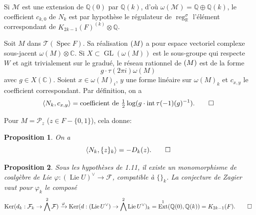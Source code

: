 \documentclass[12pt,a4paper]{article}
\theoremstyle{plain}
\newtheorem{proposition}{Proposition}[section]
\theoremstyle{definition}
\theoremstyle{remark}
\DeclareMathOperator{\Ext}{Ext}
\DeclareMathOperator*{\Ker}{Ker}
\DeclareMathOperator{\reg}{reg}
\DeclareMathOperator{\Spec}{Spec}
\DeclareMathOperator{\Lie}{Lie}
\DeclareMathOperator{\intt}{int}
\newcommand{\Q}{\mathbb{Q}}
\newcommand{\R}{\mathbb{R}}
\newcommand{\C}{\mathbb{C}}
\newcommand{\F}{\mathcal{F}}
\begin{document}
Si $\mathcal{M}$ est une extension de $\Q(0)$ par $\Q(k)$, d'o{\`u} $\omega(\mathcal{M})=\Q\oplus\Q(k)$, le coefficient $c_{k,0}$ de $N_k$ est par hypoth{\`e}se le r{\'e}gulateur de $\reg_\R^\sigma$ l'{\'e}l{\'e}ment correspondant de $K_{2k-1}(F)^{(k)}\otimes\Q$.

Soit $M$ dans $\mathcal{T}(\Spec F)$. Sa r{\'e}alisation $\real(M)$ a pour espace vectoriel complexe sous-jacent $\omega(M)\otimes\C$. Si $X\subset\operatorname{GL}(\omega(M))$ est le sous-groupe qui respecte $W$ et agit trivialement sur le gradu{\'e}, le r{\'e}seau rationnel de $\real(M)$ est de la forme
\begin{equation*}
g\cdot\tau(2\pi i)\omega(M)
\end{equation*}
avec $g\in X(\C)$. Soient $x\in\omega(M)_i$, $y$ une forme lin{\'e}aire sur $\omega(M)_k$ et $c_{x,y}$ le coefficient correspondant. Par d{\'e}finition, on a
\begin{equation*}
\langle N_k,c_{x,y}\rangle = \text{coefficient de }\tfrac{1}{2}\log(g\cdot\intt\tau(-1)(g)^{-1}).\qedhere
\end{equation*}

Pour $M=\mathcal{P}_z$ ($z\in F-\{0,1\}$), cela donne:

\begin{proposition}
On a
\begin{equation*}
\langle N_k,\{z\}_k\rangle = -D_k(z).\qedhere
\end{equation*}
\end{proposition}

\begin{proposition}
Sous les hypoth\`eses de 1.11, il existe un monomorphisme de coalg\`ebre de Lie $\varphi:(\Lie U)^\vee\to\F$, compatible {\`a} $\{\}_k$. La conjecture de Zagier vaut pour $\varphi_k$ le compos{\'e}
\begin{equation*}
\Ker(d_k:\F_k\to\bigwedge^2\F) \xrightarrow{\varphi} \Ker(d:(\Lie U^\vee)\to\bigwedge^2\Lie U^\vee)_k = \Ext^1(\Q(0),\Q(k)) = K_{2k-1}(F).\qedhere
\end{equation*}
\end{proposition}
\end{document}
